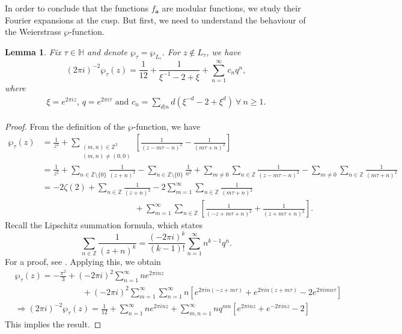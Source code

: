 \documentclass[11pt, reqno]{amsart}
\newtheorem*{lemma*}{Lemma}
\begin{document}
In order to conclude that the functions $f_{\boldsymbol{a}}$ are modular functions, we study their Fourier expansions at the cusp. But first, we need to understand the behaviour of the Weierstrass $\wp$-function.
\begin{lemma*}
Fix $\tau \in \mathbb{H}$ and denote $\wp_{\tau} = \wp_{L_{\tau}}$. For $z \not\in L_{\tau}$, we have
\begin{equation*}\label{weifou}
    (2\pi i)^{-2}\wp_\tau(z)=\frac{1}{12}+\frac{1}{\xi^{-1}-2+\xi}+\sum_{n=1}^\infty c_n q^n, 
\end{equation*}
where 
$$
\begin{aligned}
  \xi=e^{2\pi i z},\, q=e^{2\pi i\tau} \text{ and }
    c_n=\sum_{d|n}d\left(\xi^{-d}-2+\xi^d\right)\ \forall\ n\geq 1.
\end{aligned}
$$
\end{lemma*}
\begin{proof}
    From the definition of the $\wp$-function, we have 
$$
\begin{aligned}
\wp_\tau(z)&=\frac{1}{z^2}+\sum_{\substack{(m,n)\in \mathbb{Z}^2\\ (m,n)\neq (0,0)}}\left[\frac{1}{(z-m\tau-n)^2}-\frac{1}{(m\tau+n)^2} \right]\\
&=\frac{1}{z^2}+\sum_{n\in \mathbb{Z}\setminus \{0\}}\frac{1}{(z+n)^2}-\sum_{n\in \mathbb{Z}\setminus \{0\}}\frac{1}{n^2}+\sum_{m\neq 0}\sum_{n\in \mathbb{Z}}\frac{1}{(z-m\tau-n)^2}-\sum_{m\neq 0}\sum_{n\in \mathbb{Z}}\frac{1}{(m\tau+n)^2}\\
&=-2\zeta(2)+\sum_{n\in\mathbb{Z}}\frac{1}{(z+n)^2}-2\sum_{m=1}^\infty\sum_{n\in \mathbb{Z}}\frac{1}{(m\tau+n)^2}\\
& \quad \quad \quad \quad \quad \quad \quad \quad \quad \quad \quad +\sum_{m=1}^\infty\sum_{n\in \mathbb{Z}}\left[\frac{1}{(-z+m\tau+n)^2}+\frac{1}{(z+m\tau+n)^2} \right].
\end{aligned}
$$
Recall the Lipschitz summation formula, which states 
\begin{equation*} \label{lipc}
\sum_{n \in \mathbb{Z}} \frac{1}{(z+n)^{k}}=\frac{(-2 \pi i)^{k}}{(k-1) !} \sum_{n=1}^{\infty} n^{k-1} q^{n}.
\end{equation*}
For a proof, see \cite[Theorem 4.2.2]{murty-dewar-graves}. Applying this, we obtain
$$
\begin{aligned}
& \wp_\tau(z)=-\frac{\pi^2}{3}+(-2\pi i)^2\sum_{n=1}^\infty ne^{2\pi i n z}\\
& \quad \quad \quad \quad \quad\quad\quad\quad +(-2\pi i)^2\sum_{m=1}^\infty\sum_{n=1}^\infty n\left[e^{2\pi i n(-z+m\tau)}+e^{2\pi i n(z+m\tau)}-2e^{2\pi i m n \tau} \right] \\
&\Rightarrow (2\pi i)^{-2}\wp_\tau(z)=\frac{1}{12}+\sum_{n=1}^\infty ne^{2\pi i n z}+\sum_{m,n=1}^\infty nq^{mn}\left[e^{2\pi i n z}+e^{-2 \pi i n z}-2 \right]
  \end{aligned}
$$
This implies the result.
\end{proof}
\end{document}
